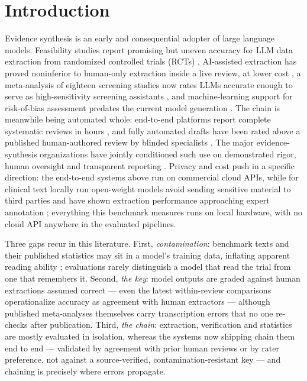 \documentclass[11pt]{article}
\begin{document}
\section{Introduction}

Evidence synthesis is an early and consequential adopter of large language models. Feasibility studies report promising but uneven accuracy for LLM data extraction from randomized controlled trials (RCTs) \citep{schmidt2024exploring}, AI-assisted extraction has proved noninferior to human-only extraction inside a live review, at lower cost \citep{lee2026noninferiority}, a meta-analysis of eighteen screening studies now rates LLMs accurate enough to serve as high-sensitivity screening assistants \citep{xie2026screening}, and machine-learning support for risk-of-bias assessment predates the current model generation \citep{soboczenski2019machine}. The chain is meanwhile being automated whole: end-to-end platforms report complete systematic reviews in hours \citep{bakker2026minutes}, and fully automated drafts have been rated above a published human-authored review by blinded specialists \citep{mclaughlin2026fully}. The major evidence-synthesis organizations have jointly conditioned such use on demonstrated rigor, human oversight and transparent reporting \citep{flemyng2025position}. Privacy and cost push in a specific direction: the end-to-end systems above run on commercial cloud APIs, while for clinical text locally run open-weight models avoid sending sensitive material to third parties and have shown extraction performance approaching expert annotation \citep{wiest2024privacy,spaanderman2025openweight}; everything this benchmark measures runs on local hardware, with no cloud API anywhere in the evaluated pipelines.

Three gaps recur in this literature. First, \emph{contamination}: benchmark texts and their published statistics may sit in a model's training data, inflating apparent reading ability \citep{xu2024contamination}; evaluations rarely distinguish a model that read the trial from one that remembers it. Second, \emph{the key}: model outputs are graded against human extractions assumed correct --- even the latest within-review comparisons operationalize accuracy as agreement with human extractors \citep{lee2026noninferiority} --- although published meta-analyses themselves carry transcription errors that no one re-checks after publication. Third, \emph{the chain}: extraction, verification and statistics are mostly evaluated in isolation, whereas the systems now shipping chain them end to end \citep{bakker2026minutes,mclaughlin2026fully} --- validated by agreement with prior human reviews or by rater preference, not against a source-verified, contamination-resistant key --- and chaining is precisely where errors propagate.
\end{document}
